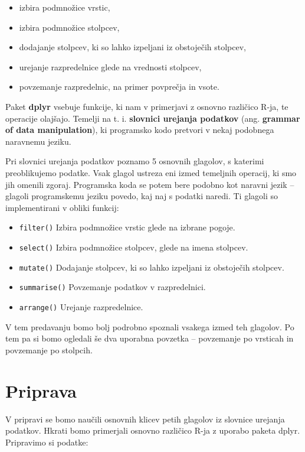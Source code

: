 \documentclass[
]{book}
\providecommand{\tightlist}{%
  \setlength{\itemsep}{0pt}\setlength{\parskip}{0pt}}
\begin{document}
\begin{itemize}
\tightlist
\item
  izbira podmnožice vrstic,
\item
  izbira podmnožice stolpcev,
\item
  dodajanje stolpcev, ki so lahko izpeljani iz obstoječih stolpcev,
\item
  urejanje razpredelnice glede na vrednosti stolpcev,
\item
  povzemanje razpredelnic, na primer povprečja in vsote.
\end{itemize}

Paket \textbf{dplyr} vsebuje funkcije, ki nam v primerjavi z osnovno različico R-ja, te operacije olajšajo. Temelji na t. i. \textbf{slovnici urejanja podatkov} (ang. \textbf{grammar of data manipulation}), ki programsko kodo pretvori v nekaj podobnega naravnemu jeziku.

Pri slovnici urejanja podatkov poznamo 5 osnovnih glagolov, s katerimi preoblikujemo podatke. Vsak glagol ustreza eni izmed temeljnih operacij, ki smo jih omenili zgoraj. Programska koda se potem bere podobno kot naravni jezik -- glagoli programskemu jeziku povedo, kaj naj s podatki naredi. Ti glagoli so implementirani v obliki funkcij:

\begin{itemize}
\tightlist
\item
  \texttt{filter()} Izbira podmnožice vrstic glede na izbrane pogoje.
\item
  \texttt{select()} Izbira podmnožice stolpcev, glede na imena stolpcev.
\item
  \texttt{mutate()} Dodajanje stolpcev, ki so lahko izpeljani iz obstoječih stolpcev.
\item
  \texttt{summarise()} Povzemanje podatkov v razpredelnici.
\item
  \texttt{arrange()} Urejanje razpredelnice.
\end{itemize}

V tem predavanju bomo bolj podrobno spoznali vsakega izmed teh glagolov. Po tem pa si bomo ogledali še dva uporabna povzetka -- povzemanje po vrsticah in povzemanje po stolpcih.

\hypertarget{priprava}{%
\section{Priprava}\label{priprava}}

V pripravi se bomo naučili osnovnih klicev petih glagolov iz slovnice urejanja podatkov. Hkrati bomo primerjali osnovno različico R-ja z uporabo paketa dplyr. Pripravimo si podatke:
\end{document}
